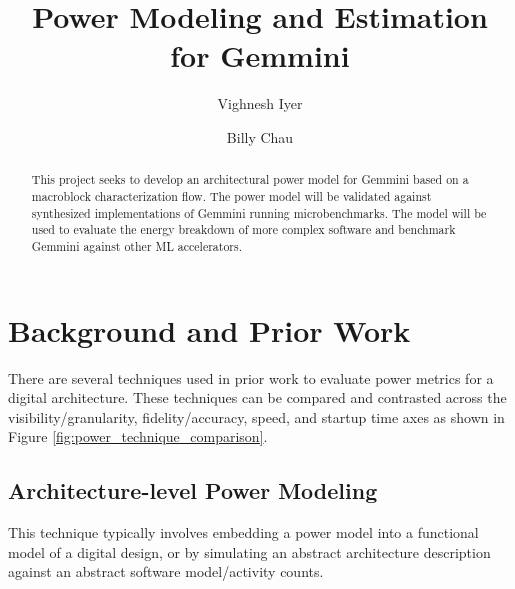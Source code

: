 \documentclass[sigconf]{acmart}
\begin{document}
\title{Power Modeling and Estimation for Gemmini}

\author{Vighnesh Iyer}

\author{Billy Chau}


\begin{abstract}
  This project seeks to develop an architectural power model for Gemmini based on a macroblock characterization flow.
  The power model will be validated against synthesized implementations of Gemmini running microbenchmarks.
  The model will be used to evaluate the energy breakdown of more complex software and benchmark Gemmini against other ML accelerators.
\end{abstract}

\maketitle

\section{Background and Prior Work}
There are several techniques used in prior work to evaluate power metrics for a digital architecture.
These techniques can be compared and contrasted across the visibility/granularity, fidelity/accuracy, speed, and startup time axes as shown in Figure \ref{fig:power_technique_comparison}.

\subsection{Architecture-level Power Modeling}\label{arch_modeling}
This technique typically involves embedding a power model into a functional model of a digital design, or by simulating an abstract architecture description against an abstract software model/activity counts.
\end{document}
